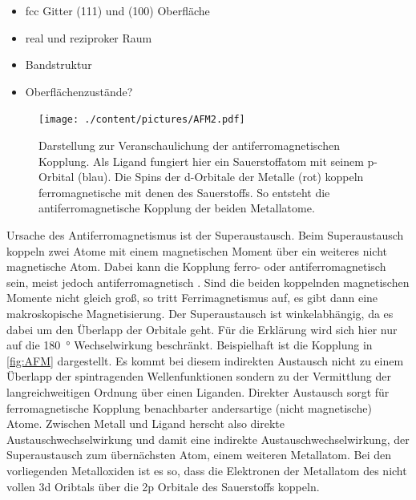         \begin{itemize}
            \item fcc Gitter (111) und (100) Oberfläche
            \item real und reziproker Raum
            \item Bandstruktur
            \item Oberflächenzustände?
        \end{itemize}

        \begin{figure}
            \centering
            \texttt{[image: ./content/pictures/AFM2.pdf]}
            \caption{Darstellung zur Veranschaulichung der antiferromagnetischen Kopplung.
            Als Ligand fungiert hier ein Sauerstoffatom mit seinem p-Orbital (blau).
            Die Spins der d-Orbitale der Metalle (rot) koppeln ferromagnetische mit denen des Sauerstoffs.
            So entsteht die antiferromagnetische Kopplung der beiden Metallatome.}
            \label{fig:AFM}
        \end{figure}
        Ursache des Antiferromagnetismus ist der Superaustausch.
        Beim Superaustausch koppeln zwei Atome mit einem magnetischen Moment über ein weiteres nicht magnetische Atom. 
        Dabei kann die Kopplung ferro- oder antiferromagnetisch sein, meist jedoch antiferromagnetisch \cite{AFM_1}.
        Sind die beiden koppelnden magnetischen Momente nicht gleich groß, so tritt Ferrimagnetismus auf, es gibt dann eine makroskopische Magnetisierung.
        Der Superaustausch ist winkelabhängig, da es dabei um den Überlapp der Orbitale geht.
        Für die Erklärung wird sich hier nur auf die \SI{180}{\degree} Wechselwirkung beschränkt.
        Beispielhaft ist die Kopplung in \autoref{fig:AFM} dargestellt.
        Es kommt bei diesem indirekten Austausch nicht zu einem Überlapp der spintragenden Wellenfunktionen sondern zu der Vermittlung der langreichweitigen Ordnung über einen Liganden.
        Direkter Austausch sorgt für ferromagnetische Kopplung benachbarter andersartige (nicht magnetische) Atome.
        Zwischen Metall und Ligand herscht also direkte Austauschwechselwirkung und damit eine indirekte Austauschwechselwirkung, der Superaustausch zum übernächsten Atom, einem weiteren Metallatom.
        Bei den vorliegenden Metalloxiden ist es so, dass die Elektronen der Metallatom des nicht vollen 3d Oribtals über die 2p Orbitale des Sauerstoffs koppeln.
